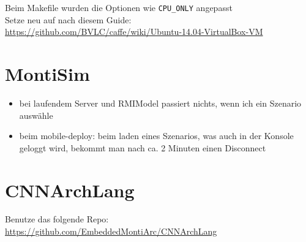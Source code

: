 \documentclass[11pt]{article}
\begin{document}
	Beim Makefile wurden die Optionen wie \texttt{CPU\_ONLY} angepasst\\
	
	Setze neu auf nach diesem Guide:\\
	\url{https://github.com/BVLC/caffe/wiki/Ubuntu-14.04-VirtualBox-VM}\\
		
	
\section{MontiSim}
	\begin{itemize}
		\item bei laufendem Server und RMIModel passiert nichts, wenn ich ein Szenario auswähle
		\item beim mobile-deploy: beim laden eines Szenarios, was auch in der Konsole geloggt wird, bekommt man nach ca. 2 Minuten einen Disconnect
	\end{itemize}
\section{CNNArchLang}
	Benutze das folgende Repo:\\
	\url{https://github.com/EmbeddedMontiArc/CNNArchLang}	
	
\end{document}
